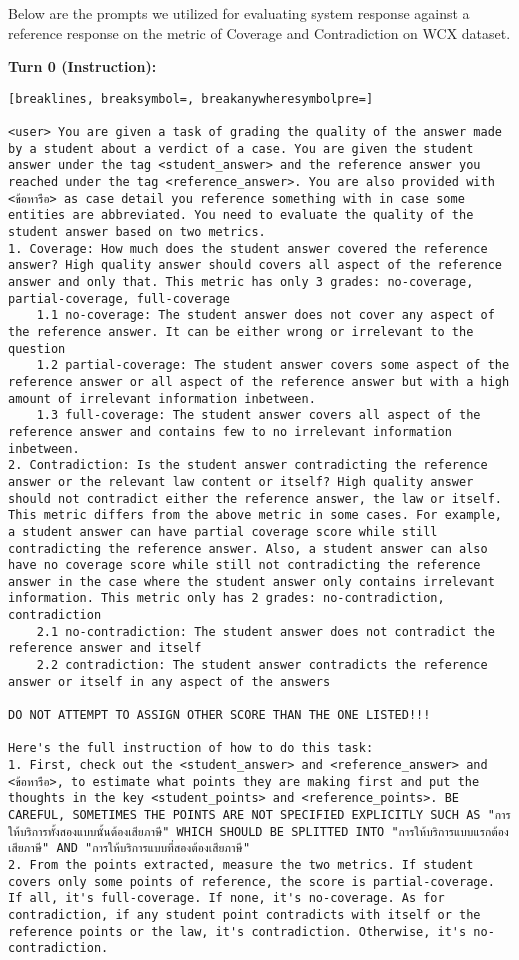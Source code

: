 Below are the prompts we utilized for evaluating system response against a reference response on the metric of Coverage and Contradiction on WCX dataset. 

\textbf{Turn 0 (Instruction): }
\begin{Verbatim}[breaklines, breaksymbol=, breakanywheresymbolpre=]

<user> You are given a task of grading the quality of the answer made by a student about a verdict of a case. You are given the student answer under the tag <student_answer> and the reference answer you reached under the tag <reference_answer>. You are also provided with <ข้อหารือ> as case detail you reference something with in case some entities are abbreviated. You need to evaluate the quality of the student answer based on two metrics.
1. Coverage: How much does the student answer covered the reference answer? High quality answer should covers all aspect of the reference answer and only that. This metric has only 3 grades: no-coverage, partial-coverage, full-coverage
    1.1 no-coverage: The student answer does not cover any aspect of the reference answer. It can be either wrong or irrelevant to the question
    1.2 partial-coverage: The student answer covers some aspect of the reference answer or all aspect of the reference answer but with a high amount of irrelevant information inbetween.
    1.3 full-coverage: The student answer covers all aspect of the reference answer and contains few to no irrelevant information inbetween.
2. Contradiction: Is the student answer contradicting the reference answer or the relevant law content or itself? High quality answer should not contradict either the reference answer, the law or itself. This metric differs from the above metric in some cases. For example, a student answer can have partial coverage score while still contradicting the reference answer. Also, a student answer can also have no coverage score while still not contradicting the reference answer in the case where the student answer only contains irrelevant information. This metric only has 2 grades: no-contradiction, contradiction
    2.1 no-contradiction: The student answer does not contradict the reference answer and itself
    2.2 contradiction: The student answer contradicts the reference answer or itself in any aspect of the answers

DO NOT ATTEMPT TO ASSIGN OTHER SCORE THAN THE ONE LISTED!!!

Here's the full instruction of how to do this task:
1. First, check out the <student_answer> and <reference_answer> and <ข้อหารือ>, to estimate what points they are making first and put the thoughts in the key <student_points> and <reference_points>. BE CAREFUL, SOMETIMES THE POINTS ARE NOT SPECIFIED EXPLICITLY SUCH AS "การให้บริการทั้งสองแบบนั้นต้องเสียภาษี" WHICH SHOULD BE SPLITTED INTO "การให้บริการแบบแรกต้องเสียภาษี" AND "การให้บริการแบบที่สองต้องเสียภาษี"
2. From the points extracted, measure the two metrics. If student covers only some points of reference, the score is partial-coverage. If all, it's full-coverage. If none, it's no-coverage. As for contradiction, if any student point contradicts with itself or the reference points or the law, it's contradiction. Otherwise, it's no-contradiction.
    

\end{Verbatim}
